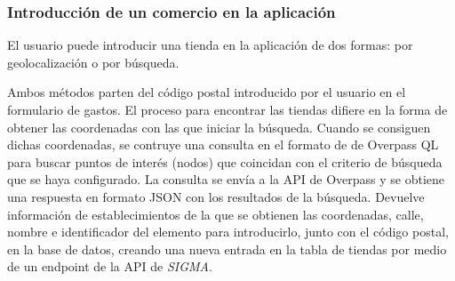 \subsubsection{Introducción de un comercio en la aplicación}
El usuario puede introducir una tienda en la aplicación de dos formas: por geolocalización o por búsqueda.

Ambos métodos parten del código postal introducido por el usuario en el formulario de gastos. El proceso para encontrar las tiendas difiere en la forma de obtener las coordenadas con las que iniciar la búsqueda. Cuando se consiguen dichas coordenadas, se contruye una consulta en el formato de de Overpass QL para buscar puntos de interés (nodos) que coincidan con el criterio de búsqueda que se haya configurado. La consulta se envía a la API de Overpass y se obtiene una respuesta en formato JSON con los resultados de la búsqueda. Devuelve información de establecimientos de la que se obtienen las coordenadas, calle, nombre e identificador del elemento para introducirlo, junto con el código postal, en la base de datos, creando una nueva entrada en la tabla de tiendas por medio de un endpoint de la API de \textit{SIGMA}.

